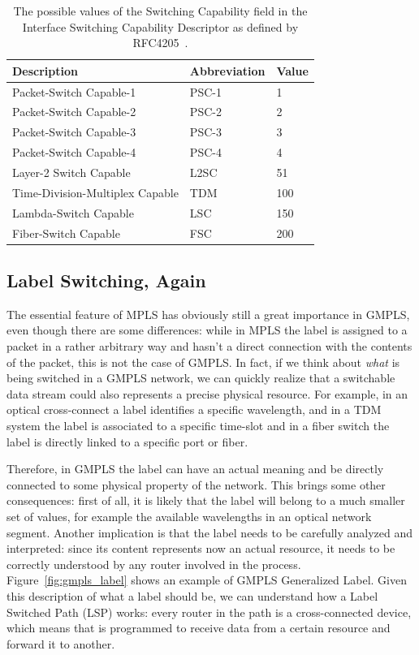 \documentclass[10pt,a4paper]{report}
\begin{document}
\begin{table}[!hbp]
  \begin{center}
    \begin{tabular}{|l|l|l|}
      \hline
      Description & Abbreviation & Value \\ \hline
      Packet-Switch Capable-1 & PSC-1 & 1 \\
      Packet-Switch Capable-2 & PSC-2 & 2 \\
      Packet-Switch Capable-3 & PSC-3 & 3 \\
      Packet-Switch Capable-4 & PSC-4 & 4 \\
      Layer-2 Switch Capable & L2SC & 51 \\
      Time-Division-Multiplex Capable & TDM & 100 \\
      Lambda-Switch Capable & LSC & 150 \\
      Fiber-Switch Capable & FSC & 200 \\
      \hline
    \end{tabular}
    \caption[Interface Switching Capability Descriptors]{The possible
      values of the Switching Capability field in the Interface
      Switching Capability Descriptor as defined by
      RFC4205~\cite{rfc4205}.}
    \label{tab:gmpls_iscd}
  \end{center}
\end{table}

\subsection{Label Switching, Again}
The essential feature of MPLS has obviously still a great importance
in GMPLS, even though there are some differences: while in MPLS the
label is assigned to a packet in a rather arbitrary way and hasn't a
direct connection with the contents of the packet, this is not the
case of GMPLS\@. In fact, if we think about \textit{what} is being
switched in a GMPLS network, we can quickly realize that a switchable
data stream could also represents a precise physical resource. For
example, in an optical cross-connect a label identifies a specific
wavelength, and in a TDM system the label is associated to a specific
time-slot and in a fiber switch the label is directly linked to a
specific port or fiber.

Therefore, in GMPLS the label can have an actual meaning and be
directly connected to some physical property of the network. This
brings some other consequences: first of all, it is likely that the
label will belong to a much smaller set of values, for example the
available wavelengths in an optical network segment. Another
implication is that the label needs to be carefully analyzed and
interpreted: since its content represents now an actual resource, it
needs to be correctly understood by any router involved in the
process. Figure~\ref{fig:gmpls_label} shows an example of GMPLS
Generalized Label. Given this description of what a label should be,
we can understand how a Label Switched Path (LSP) works: every router
in the path is a cross-connected device, which means that is
programmed to receive data from a certain resource and forward it to
another.
\end{document}
